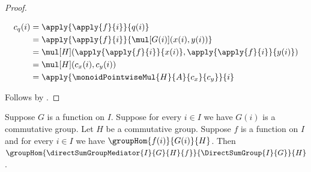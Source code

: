 \begin{proof}
\begin{subproof}
\begin{align*}
            c_q(i)
                &= \apply{\apply{f}{i}}{q(i)}
                \\
                &= \apply{\apply{f}{i}}{
                    \mul[G(i)](x(i),y(i))}
                \\
                &= \mul[H](\apply{\apply{f}{i}}{x(i)},
                    \apply{\apply{f}{i}}{y(i)})
                \\
                &= \mul[H](c_x(i),c_y(i))
                \\
                &= \apply{\monoidPointwiseMul{H}{A}{c_x}{c_y}}{i}
        \end{align*}
    \end{subproof}
    Follows by .
\end{proof}

\begin{theorem}\label{direct_sum_group_mediator_hom}
    Suppose $G$ is a function on $I$.
    Suppose for every $i\in I$ we have $G(i)$ is a commutative group.
    Let $H$ be a commutative group.
    Suppose $f$ is a function on $I$ and
        for every $i\in I$ we have $\groupHom{f(i)}{G(i)}{H}$.
    Then
        $\groupHom{\directSumGroupMediator{I}{G}{H}{f}}{
            \DirectSumGroup{I}{G}}{H}$.
\end{theorem}
